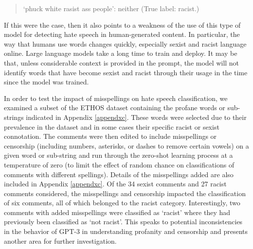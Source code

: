 \documentclass[12pt,]{article}
\begin{document}
\begin{quote}
`phuck white rasist ass people': neither (True label: racist.)
\end{quote}

If this were the case, then it also points to a weakness of the use of this type of model for detecting hate speech in human-generated content. In particular, the way that humans use words changes quickly, especially sexist and racist language online. Large language models take a long time to train and deploy. It may be that, unless considerable context is provided in the prompt, the model will not identify words that have become sexist and racist through their usage in the time since the model was trained.

In order to test the impact of misspellings on hate speech classification, we examined a subset of the ETHOS dataset containing the profane words or sub-strings indicated in Appendix \ref{appendxc}. These words were selected due to their prevalence in the dataset and in some cases their specific racist or sexist connotation. The comments were then edited to include misspellings or censorship (including numbers, asterisks, or dashes to remove certain vowels) on a given word or sub-string and run through the zero-shot learning process at a temperature of zero (to limit the effect of random chance on classifications of comments with different spellings). Details of the misspellings added are also included in Appendix \ref{appendxc}. Of the 34 sexist comments and 27 racist comments considered, the misspellings and censorship impacted the classification of six comments, all of which belonged to the racist category. Interestingly, two comments with added misspellings were classified as `racist' where they had previously been classified as `not racist'. This speaks to potential inconsistencies in the behavior of GPT-3 in understanding profanity and censorship and presents another area for further investigation.
\end{document}
